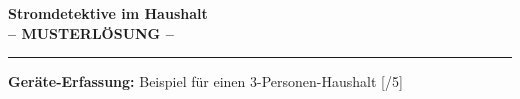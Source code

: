 \documentclass[11pt, a4paper]{article}
\newcommand{\thema}{Stromdetektive im Haushalt}
\newcommand{\punktebox}[1]{\hfill\small\textcolor{mittelgrau}{[\hspace{0.8em}/#1]}}
\begin{document}

\begin{center}
    {\Large\bfseries\textcolor{fachfarbe}{\thema}}\\[0.2em]
    {\normalsize\textcolor{loesung}{\textbf{-- MUSTERLÖSUNG --}}}
\end{center}
\vspace{-0.2em}
\hrule
\vspace{0.5em}


\textbf{\textcolor{physik}{Geräte-Erfassung:}} Beispiel für einen 3-Personen-Haushalt \punktebox{5}

\vspace{0.3em}
\small
\renewcommand{\arraystretch}{1.1}
\end{document}
